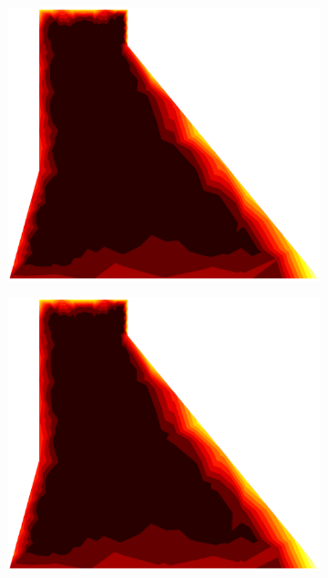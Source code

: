 \documentclass[10pt, a4paper]{article}
\begin{document}
\begin{figure}[H]
\begin{subfigure}[H]{0.19\textwidth}
		\includegraphics[width=1.2\textwidth]{fig/8.eps}
	\end{subfigure}
	\begin{subfigure}[H]{0.19\textwidth}
		\includegraphics[width=1.2\textwidth]{fig/9.eps}
	\end{subfigure}
		\begin{subfigure}[H]{0.19\textwidth}

\end{subfigure}
\end{figure}
\end{document}
